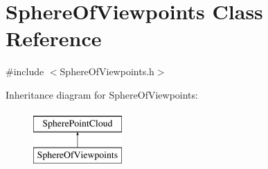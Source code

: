 \hypertarget{class_sphere_of_viewpoints}{\section{Sphere\+Of\+Viewpoints Class Reference}
\label{class_sphere_of_viewpoints}
}


{\ttfamily \#include $<$Sphere\+Of\+Viewpoints.\+h$>$}

Inheritance diagram for Sphere\+Of\+Viewpoints\+:\begin{figure}[H]
\begin{center}
\leavevmode
\includegraphics[height=2.000000cm]{class_sphere_of_viewpoints}
\end{center}
\end{figure}
